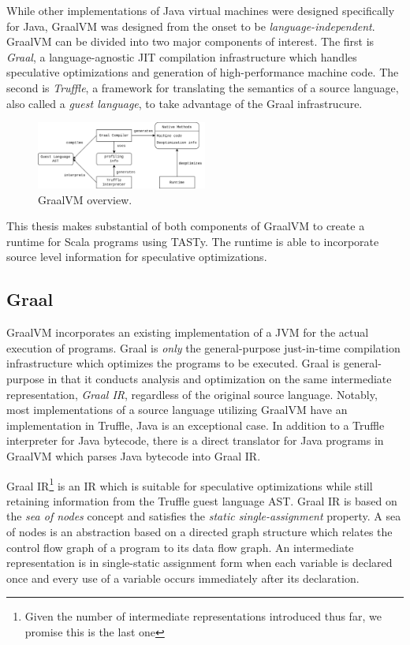 While other implementations of Java virtual machines were designed specifically for Java, GraalVM was designed from the onset to be \textit{language-independent}.
GraalVM can be divided into two major components of interest. 
The first is \textit{Graal}, a language-agnostic JIT compilation infrastructure which handles speculative optimizations and generation of high-performance machine code.
The second is \textit{Truffle}, a framework for translating the semantics of a source language, also called a \textit{guest language}, to take advantage of the Graal infrastrucure.

\begin{figure}[!htb]
	\centering
	\includegraphics[width=0.5\textwidth]{figures/graalvm-pipeline.png}
	\caption{GraalVM overview\cite{graalvm:ir}.}
\end{figure}

This thesis makes substantial of both components of GraalVM to create a runtime for Scala programs using TASTy.
The runtime is able to incorporate source level information for speculative optimizations.

\subsection{Graal}

GraalVM incorporates an existing implementation of a JVM\cite{java:hotspot} for the actual execution of programs.
Graal is \textit{only} the general-purpose just-in-time compilation infrastructure which optimizes the programs to be executed.
Graal is general-purpose in that it conducts analysis and optimization on the same intermediate representation, \textit{Graal IR}, regardless of the original source language.
Notably, most implementations of a source language utilizing GraalVM have an implementation in Truffle, Java is an exceptional case.
In addition to a Truffle interpreter for Java bytecode\cite{graalvm:espresso}, there is a direct translator for Java programs in GraalVM which parses Java bytecode into Graal IR.

Graal IR\cite{graalvm:ir}\footnote{Given the number of intermediate representations introduced thus far, we promise this is the last one} is an IR which is suitable for speculative optimizations while still retaining information from the Truffle guest language AST.
Graal IR is based on the \textit{sea of nodes} concept\cite{click:sea-of-nodes} and satisfies the \textit{static single-assignment}\cite{ssa} property.
A sea of nodes is an abstraction based on a directed graph structure which relates the control flow graph\cite{allen:ctrl-flow-analysis} of a program to its data flow graph\cite{allen:data-flow-analysis}.
An intermediate representation is in single-static assignment form when each variable is declared once and every use of a variable occurs immediately after its declaration\cite{johnson:use-def-chains}.


